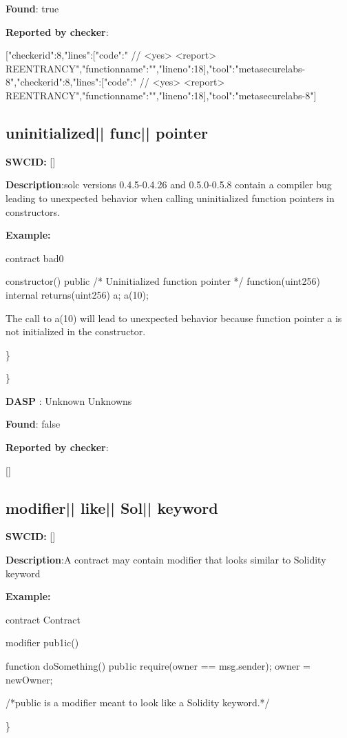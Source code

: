 \documentclass{article}
\begin{document}
\textbf{Found}: true

\textbf{Reported by checker}: 
\begin{ffcode} 

[{"checker\textunderscore id":8,"lines":[{"code":"      // <yes> <report> REENTRANCY\n","function\textunderscore name":"","line\textunderscore no":18}],"tool":"metasecurelabs-8"},{"checker\textunderscore id":8,"lines":[{"code":"      // <yes> <report> REENTRANCY\n","function\textunderscore name":"","line\textunderscore no":18}],"tool":"metasecurelabs-8"}]
\end{ffcode} 
\subsection{uninitialized{|\textunderscore| }func{|\textunderscore| }pointer} 
\textbf{SWC{\textunderscore }ID:} []

\textbf{Description}:solc versions 0.4.5-0.4.26 and 0.5.0-0.5.8 contain a compiler bug leading to unexpected behavior when calling uninitialized function pointers in constructors.


\textbf{Example:} 
\begin{ffcode} 

contract bad0 {

  constructor() public {
    /* Uninitialized function pointer */
    function(uint256) internal returns(uint256) a;
    a(10);
  }
}

The call to a(10) will lead to unexpected behavior because function pointer a is not initialized in the constructor.

\end{ffcode} 
\} 

\} 

\textbf{DASP} : Unknown Unknowns

\textbf{Found}: false

\textbf{Reported by checker}: 
\begin{ffcode} 

[]
\end{ffcode} 
\subsection{modifier{|\textunderscore| }like{|\textunderscore| }Sol{|\textunderscore| }keyword} 
\textbf{SWC{\textunderscore }ID:} []

\textbf{Description}:A contract may contain modifier that looks similar to Solidity keyword


\textbf{Example:} 
\begin{ffcode} 

contract Contract{
    modifier pub1ic() {
    }

    function doSomething() pub1ic {
        require(owner == msg.sender);
        owner = newOwner;
    }
}

 /*public is a modifier meant to look like a Solidity keyword.*/ 

\end{ffcode} 
\} 
\end{document}
